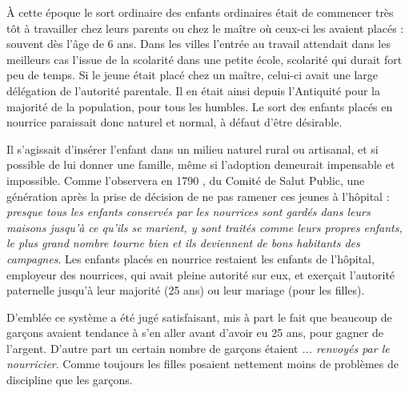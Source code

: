  À cette époque le sort ordinaire des enfants ordinaires était de commencer très tôt à travailler chez leurs parents ou chez le maître où ceux-ci les avaient placés : souvent dès l'âge de 6 ans. Dans les villes l'entrée au travail attendait dans les meilleurs cas l'issue de la scolarité dans une petite école, scolarité qui durait fort peu de temps. Si le jeune était placé chez un maître, celui-ci avait une large délégation de l'autorité parentale. Il en était ainsi depuis l'Antiquité pour la majorité de la population, pour tous les humbles. Le sort des enfants placés en nourrice paraissait donc naturel et normal, à défaut d'être désirable.

 Il s'agissait d'insérer l'enfant dans un milieu naturel rural ou artisanal, et si possible de lui donner une famille, même si l'adoption demeurait impensable et impossible. Comme l'observera en 1790 , du Comité de Salut Public, une génération après la prise de décision de ne pas ramener ces jeunes à l'hôpital : \emph{presque tous les enfants conservés par les nourrices sont gardés dans leurs maisons jusqu'à ce qu'ils se marient, y sont traités comme leurs propres enfants, le plus grand nombre tourne bien et ils deviennent de bons habitants des campagnes}. Les enfants placés en nourrice restaient les enfants de l'hôpital, employeur des nourrices, qui avait pleine autorité sur eux, et exerçait l'autorité paternelle jusqu'à leur majorité (25 ans) ou leur mariage (pour les filles). 

 D'emblée ce système a été jugé satisfaisant, mis à part le fait que beaucoup de garçons avaient tendance à s'en aller avant d'avoir eu 25 ans, pour gagner de l'argent. D'autre part un certain nombre de garçons étaient \emph{... renvoyés par le nourricier}. Comme toujours les filles posaient nettement moins de problèmes de discipline que les garçons. 

